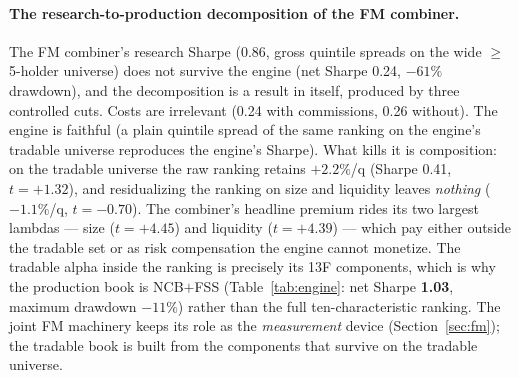 \paragraph{The research-to-production decomposition of the FM
combiner.} The FM combiner's research Sharpe (0.86, gross quintile
spreads on the wide $\ge$5-holder universe) does not survive the
engine (net Sharpe 0.24, $-61\%$ drawdown), and the decomposition is
a result in itself, produced by three controlled cuts. Costs are
irrelevant (0.24 with commissions, 0.26 without). The engine is
faithful (a plain quintile spread of the same ranking on the engine's
tradable universe reproduces the engine's Sharpe). What kills it is
composition: on the tradable universe the raw ranking retains
$+2.2\%$/q (Sharpe 0.41, $t=+1.32$), and residualizing the ranking
on size and liquidity leaves \emph{nothing} ($-1.1\%$/q, $t=-0.70$).
The combiner's headline premium rides its two largest lambdas ---
size ($t=+4.45$) and liquidity ($t=+4.39$) --- which pay either
outside the tradable set or as risk compensation the engine cannot
monetize. The tradable alpha inside the ranking is precisely its 13F
components, which is why the production book is NCB$+$FSS
(Table~\ref{tab:engine}: net Sharpe \textbf{1.03}, maximum drawdown
$-11\%$) rather than the full ten-characteristic ranking. The joint
FM machinery keeps its role as the \emph{measurement} device
(Section~\ref{sec:fm}); the tradable book is built from the
components that survive on the tradable universe.
